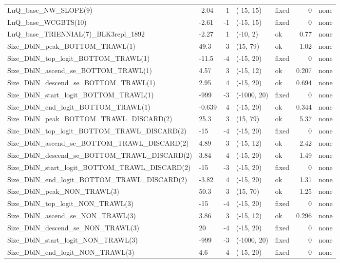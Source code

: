 \documentclass[
]{scrartcl}
\begin{document}
\begin{longtable}{llrllrl}
LnQ\_base\_NW\_SLOPE(9) & -2.04 & -1 & (-15, 15) & fixed & 0 & none \\ 
LnQ\_base\_WCGBTS(10) & -2.61 & -1 & (-15, 15) & fixed & 0 & none \\ 
LnQ\_base\_TRIENNIAL(7)\_BLK3repl\_1892 & -2.27 & 1 & (-10, 2) & ok & 0.77 & none \\ 
Size\_DblN\_peak\_BOTTOM\_TRAWL(1) & 49.3 & 3 & (15, 79) & ok & 1.02 & none \\ 
Size\_DblN\_top\_logit\_BOTTOM\_TRAWL(1) & -11.5 & -4 & (-15, 20) & fixed & 0 & none \\ 
Size\_DblN\_ascend\_se\_BOTTOM\_TRAWL(1) & 4.57 & 3 & (-15, 12) & ok & 0.207 & none \\ 
Size\_DblN\_descend\_se\_BOTTOM\_TRAWL(1) & 2.95 & 4 & (-15, 20) & ok & 0.694 & none \\ 
Size\_DblN\_start\_logit\_BOTTOM\_TRAWL(1) & -999 & -3 & (-1000, 20) & fixed & 0 & none \\ 
Size\_DblN\_end\_logit\_BOTTOM\_TRAWL(1) & -0.639 & 4 & (-15, 20) & ok & 0.344 & none \\ 
Size\_DblN\_peak\_BOTTOM\_TRAWL\_DISCARD(2) & 25.3 & 3 & (15, 79) & ok & 5.37 & none \\ 
Size\_DblN\_top\_logit\_BOTTOM\_TRAWL\_DISCARD(2) & -15 & -4 & (-15, 20) & fixed & 0 & none \\ 
Size\_DblN\_ascend\_se\_BOTTOM\_TRAWL\_DISCARD(2) & 4.89 & 3 & (-15, 12) & ok & 2.42 & none \\ 
Size\_DblN\_descend\_se\_BOTTOM\_TRAWL\_DISCARD(2) & 3.84 & 4 & (-15, 20) & ok & 1.49 & none \\ 
Size\_DblN\_start\_logit\_BOTTOM\_TRAWL\_DISCARD(2) & -15 & -3 & (-15, 20) & fixed & 0 & none \\ 
Size\_DblN\_end\_logit\_BOTTOM\_TRAWL\_DISCARD(2) & -3.82 & 4 & (-15, 20) & ok & 1.31 & none \\ 
Size\_DblN\_peak\_NON\_TRAWL(3) & 50.3 & 3 & (15, 70) & ok & 1.25 & none \\ 
Size\_DblN\_top\_logit\_NON\_TRAWL(3) & -15 & -4 & (-15, 20) & fixed & 0 & none \\ 
Size\_DblN\_ascend\_se\_NON\_TRAWL(3) & 3.86 & 3 & (-15, 12) & ok & 0.296 & none \\ 
Size\_DblN\_descend\_se\_NON\_TRAWL(3) & 20 & -4 & (-15, 20) & fixed & 0 & none \\ 
Size\_DblN\_start\_logit\_NON\_TRAWL(3) & -999 & -3 & (-1000, 20) & fixed & 0 & none \\ 
Size\_DblN\_end\_logit\_NON\_TRAWL(3) & 4.6 & -4 & (-15, 20) & fixed & 0 & none \\ 

\end{longtable}
\end{document}

